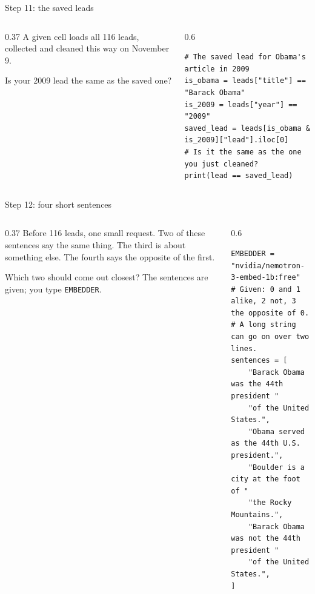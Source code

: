 \documentclass[9pt,aspectratio=169]{beamer}
\begin{document}
\begin{frame}[fragile]{Step 11: the saved leads}
    \begin{columns}[T]
        \begin{column}{0.37\textwidth}
            A given cell loads all 116 leads, collected and cleaned this way on November 9.

            \medskip
            Is your 2009 lead the same as the saved one?
        \end{column}
        \begin{column}{0.6\textwidth}
\begin{lstlisting}
# The saved lead for Obama's article in 2009
is_obama = leads["title"] == "Barack Obama"
is_2009 = leads["year"] == "2009"
saved_lead = leads[is_obama & is_2009]["lead"].iloc[0]
# Is it the same as the one you just cleaned?
print(lead == saved_lead)
\end{lstlisting}
        \end{column}
    \end{columns}
\end{frame}

\begin{frame}[fragile]{Step 12: four short sentences}
    \begin{columns}[T]
        \begin{column}{0.37\textwidth}
            Before 116 leads, one small request. Two of these sentences say the same thing. The third is about something else. The fourth says the opposite of the first.

            \medskip
            Which two should come out closest? The sentences are given; you type \texttt{EMBEDDER}.
        \end{column}
        \begin{column}{0.6\textwidth}
\begin{lstlisting}
EMBEDDER = "nvidia/nemotron-3-embed-1b:free"
# Given: 0 and 1 alike, 2 not, 3 the opposite of 0.
# A long string can go on over two lines.
sentences = [
    "Barack Obama was the 44th president "
    "of the United States.",
    "Obama served as the 44th U.S. president.",
    "Boulder is a city at the foot of "
    "the Rocky Mountains.",
    "Barack Obama was not the 44th president "
    "of the United States.",
]
\end{lstlisting}
        \end{column}
    \end{columns}
\end{frame}
\end{document}
